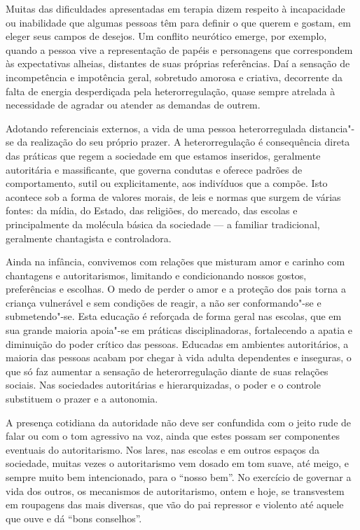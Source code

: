 Muitas das dificuldades apresentadas em terapia dizem respeito à
incapacidade ou inabilidade que algumas pessoas têm para definir o que
querem e gostam, em eleger seus campos de desejos. Um conflito
neurótico emerge, por exemplo, quando a pessoa vive a representação de
papéis e personagens que correspondem às expectativas alheias, distantes
de suas próprias referências. Daí a sensação de incompetência e
impotência geral, sobretudo amorosa e criativa, decorrente da falta de
energia desperdiçada pela heterorregulação, quase sempre atrelada à
necessidade de agradar ou atender as demandas de outrem.

Adotando referenciais externos, a vida de uma pessoa heterorregulada
distancia"-se da realização do seu próprio prazer. A heterorregulação é
consequência direta das práticas que regem a sociedade em que estamos
inseridos, geralmente autoritária e massificante, que governa condutas e
oferece padrões de comportamento, sutil ou explicitamente, aos
indivíduos que a compõe. Isto acontece sob a forma de valores morais, de
leis e normas que surgem de várias fontes: da mídia, do Estado, das
religiões, do mercado, das escolas e principalmente da molécula básica
da sociedade --- a familiar tradicional, geralmente chantagista e
controladora.

Ainda na infância, convivemos com relações que misturam amor e carinho
com chantagens e autoritarismos, limitando e condicionando nossos
gostos, preferências e escolhas. O medo de perder o amor e a proteção
dos pais torna a criança vulnerável e sem condições de reagir, a não ser
conformando"-se e submetendo"-se. Esta educação é reforçada de forma geral nas
escolas, que em sua grande maioria apoia"-se em práticas disciplinadoras,
fortalecendo a apatia e diminuição do poder crítico das pessoas.
Educadas em ambientes autoritários, a maioria das pessoas acabam por
chegar à vida adulta dependentes e inseguras, o que só faz aumentar a
sensação de heterorregulação diante de suas relações sociais. Nas
sociedades autoritárias e hierarquizadas, o poder e o controle
substituem o prazer e a autonomia.

A presença cotidiana da autoridade não deve ser confundida com o jeito
rude de falar ou com o tom agressivo na voz, ainda que estes possam ser
componentes eventuais do autoritarismo. Nos lares, nas escolas e em
outros espaços da sociedade, muitas vezes o autoritarismo vem dosado em
tom suave, até meigo, e sempre muito bem intencionado, para o ``nosso
bem''. No exercício de governar a vida dos outros, os mecanismos de
autoritarismo, ontem e hoje, se transvestem em roupagens das mais
diversas, que vão do pai repressor e violento até aquele que ouve e dá
``bons conselhos''.

